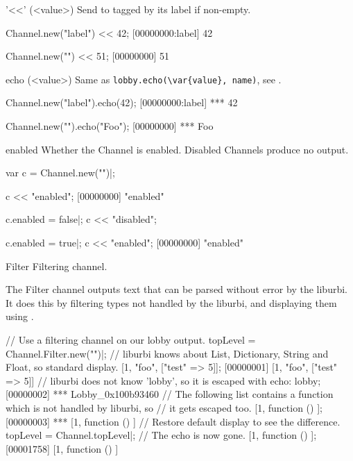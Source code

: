 \begin{urbiscriptapi}
\item['<<'](<value>)%
  Send  to \this tagged by its label if non-empty.

\begin{urbiscript}
Channel.new("label") << 42;
[00000000:label] 42

Channel.new("") << 51;
[00000000] 51
\end{urbiscript}


\item[echo](<value>)%
  Same as \lstinline|lobby.echo(\var{value}, name)|, see
  .

\begin{urbiscript}
Channel.new("label").echo(42);
[00000000:label] *** 42

Channel.new("").echo("Foo");
[00000000] *** Foo
\end{urbiscript}


\item[enabled] Whether the Channel is enabled.  Disabled Channels
  produce no output.
\begin{urbiscript}
var c = Channel.new("")|;

c << "enabled";
[00000000] "enabled"

c.enabled = false|;
c << "disabled";

c.enabled = true|;
c << "enabled";
[00000000] "enabled"
\end{urbiscript}


\item[Filter] Filtering channel.

The Filter channel outputs text that can be parsed without error by the liburbi.
It does this by filtering types not handled by the liburbi, and displaying
them using .

\begin{urbiscript}
// Use a filtering channel on our lobby output.
topLevel = Channel.Filter.new("")|;
// liburbi knows about List, Dictionary, String and Float, so standard display.
[1, "foo", ["test" => 5]];
[00000001] [1, "foo", ["test" => 5]]
// liburbi does not know 'lobby', so it is escaped with echo:
lobby;
[00000002] *** Lobby_0x100b93460
// The following list contains a function which is not handled by liburbi, so
// it gets escaped too.
[1, function () {}];
[00000003] *** [1, function () {}]
// Restore default display to see the difference.
topLevel = Channel.topLevel|;
// The echo is now gone.
[1, function () {}];
[00001758] [1, function () {}]
\end{urbiscript}



\end{urbiscriptapi}
